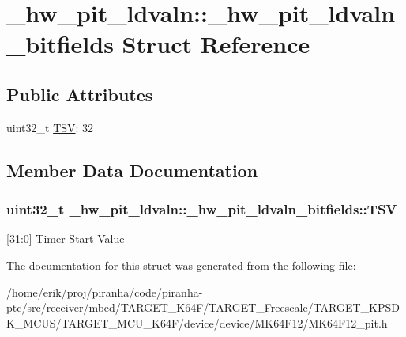 \hypertarget{struct__hw__pit__ldvaln_1_1__hw__pit__ldvaln__bitfields}{}\section{\+\_\+hw\+\_\+pit\+\_\+ldvaln\+:\+:\+\_\+hw\+\_\+pit\+\_\+ldvaln\+\_\+bitfields Struct Reference}
\label{struct__hw__pit__ldvaln_1_1__hw__pit__ldvaln__bitfields}
\subsection*{Public Attributes}
\begin{DoxyCompactItemize}
\item 
uint32\+\_\+t \hyperlink{struct__hw__pit__ldvaln_1_1__hw__pit__ldvaln__bitfields_a7f7b735d83b7e834278f8e1f68a9c6da}{T\+SV}\+: 32
\end{DoxyCompactItemize}


\subsection{Member Data Documentation}
\subsubsection[{\texorpdfstring{T\+SV}{TSV}}]{\setlength{\rightskip}{0pt plus 5cm}uint32\+\_\+t \+\_\+hw\+\_\+pit\+\_\+ldvaln\+::\+\_\+hw\+\_\+pit\+\_\+ldvaln\+\_\+bitfields\+::\+T\+SV}\hypertarget{struct__hw__pit__ldvaln_1_1__hw__pit__ldvaln__bitfields_a7f7b735d83b7e834278f8e1f68a9c6da}{}\label{struct__hw__pit__ldvaln_1_1__hw__pit__ldvaln__bitfields_a7f7b735d83b7e834278f8e1f68a9c6da}
\mbox{[}31\+:0\mbox{]} Timer Start Value 

The documentation for this struct was generated from the following file\+:\begin{DoxyCompactItemize}
\item 
/home/erik/proj/piranha/code/piranha-\/ptc/src/receiver/mbed/\+T\+A\+R\+G\+E\+T\+\_\+\+K64\+F/\+T\+A\+R\+G\+E\+T\+\_\+\+Freescale/\+T\+A\+R\+G\+E\+T\+\_\+\+K\+P\+S\+D\+K\+\_\+\+M\+C\+U\+S/\+T\+A\+R\+G\+E\+T\+\_\+\+M\+C\+U\+\_\+\+K64\+F/device/device/\+M\+K64\+F12/M\+K64\+F12\+\_\+pit.\+h\end{DoxyCompactItemize}

